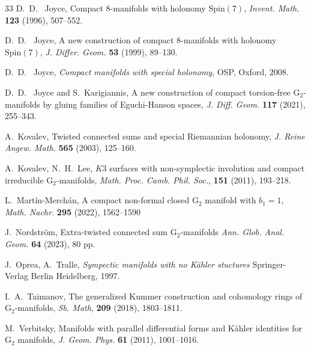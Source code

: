 \documentclass[10pt]{article}
\newcommand{\Spin}[1]{\mathrm{Spin}(#1)}
\newcommand{\Gtwo}{\mathrm{G}_2}
\theoremstyle{plain}
\theoremstyle{definition}
\theoremstyle{remark}
\begin{document}
\begin{thebibliography}{33}
 D.~D.~ Joyce, Compact 8-manifolds with holonomy $\Spin{7}$, {\em Invent. Math.} {\bf 123} (1996), 507--552.

  D.~D.~ Joyce, A new construction of compact 8-manifolds with holonomy $\Spin{7}$, {\em J. Differ. Geom.} {\bf 53} (1999), 89--130. 

  D.~D.~ Joyce, {\em Compact manifolds with special holonomy}, OSP, Oxford, 2008.
  
  
  

   D.~D.~ Joyce and S.~Karigiannis,  A new construction of compact torsion-free $\Gtwo$-manifolds 
 by gluing families of Eguchi-Hanson spaces,  {\em J.  Diff. Geom.} {\bf 117} (2021), 255--343.
 
A.~Kovalev, Twisted connected sums and special Riemannian holonomy, 
{\em J. Reine Angew. Math.\/}  {\bf 565}  (2003), 125--160.

A.~Kovalev, N.~H.~Lee,  $K3$ surfaces with non-symplectic involution
and compact irreducible $\Gtwo$-manifolds,
{\it Math. Proc. Camb. Phil. Soc.\/}, {\bf 151} (2011), 193--218.



L.~Martín-Merchán, A compact non-formal closed $\Gtwo$ manifold with $b_1=1$, 	{\em Math. Nachr.} {\bf 295} (2022), 1562--1590

J.~Nordström,   Extra-twisted connected sum $\Gtwo$-manifolds  {\em Ann. Glob. Anal. Geom.} {\bf 64} (2023), 80 pp.

J.~Oprea, A.~Tralle, {\em Sympectic manifolds with no K\" ahler stuctures }
Springer-Verlag Berlin Heidelberg, 1997.

I.~A.~Taimanov, The generalized Kummer construction and cohomology rings of
$\Gtwo$-manifolds, {\em  Sb. Math}, {\bf 209} (2018), 1803--1811.

M.~Verbitsky, Manifolds with parallel differential forms and Kähler identities for $\Gtwo$ manifolds, \textit{J.
Geom. Phys.} \textbf{61} (2011), 1001--1016.
 
 \end{thebibliography}
\end{document}
